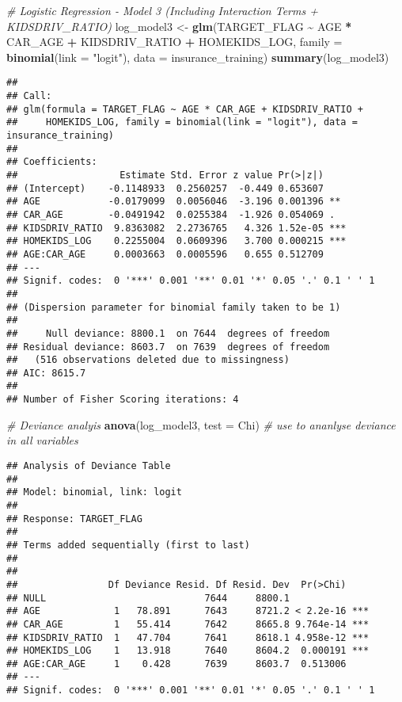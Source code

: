 \documentclass[
]{article}
\newenvironment{Shaded}{\begin{snugshade}}{\end{snugshade}}
\newcommand{\AttributeTok}[1]{\textcolor[rgb]{0.13,0.29,0.53}{#1}}
\newcommand{\CommentTok}[1]{\textcolor[rgb]{0.56,0.35,0.01}{\textit{#1}}}
\newcommand{\FunctionTok}[1]{\textcolor[rgb]{0.13,0.29,0.53}{\textbf{#1}}}
\newcommand{\NormalTok}[1]{#1}
\newcommand{\OtherTok}[1]{\textcolor[rgb]{0.56,0.35,0.01}{#1}}
\newcommand{\SpecialCharTok}[1]{\textcolor[rgb]{0.81,0.36,0.00}{\textbf{#1}}}
\newcommand{\StringTok}[1]{\textcolor[rgb]{0.31,0.60,0.02}{#1}}
\begin{document}
\begin{Shaded}
\begin{Highlighting}[]
\CommentTok{\# Logistic Regression {-} Model 3 (Including Interaction Terms + KIDSDRIV\_RATIO)}
\NormalTok{log\_model3 }\OtherTok{\textless{}{-}} \FunctionTok{glm}\NormalTok{(TARGET\_FLAG }\SpecialCharTok{\textasciitilde{}}\NormalTok{ AGE }\SpecialCharTok{*}\NormalTok{ CAR\_AGE }\SpecialCharTok{+}\NormalTok{ KIDSDRIV\_RATIO }\SpecialCharTok{+}\NormalTok{ HOMEKIDS\_LOG, }
                          \AttributeTok{family =} \FunctionTok{binomial}\NormalTok{(}\AttributeTok{link =} \StringTok{"logit"}\NormalTok{), }\AttributeTok{data =}\NormalTok{ insurance\_training)}
\FunctionTok{summary}\NormalTok{(log\_model3)}
\end{Highlighting}
\end{Shaded}

\begin{verbatim}
## 
## Call:
## glm(formula = TARGET_FLAG ~ AGE * CAR_AGE + KIDSDRIV_RATIO + 
##     HOMEKIDS_LOG, family = binomial(link = "logit"), data = insurance_training)
## 
## Coefficients:
##                  Estimate Std. Error z value Pr(>|z|)    
## (Intercept)    -0.1148933  0.2560257  -0.449 0.653607    
## AGE            -0.0179099  0.0056046  -3.196 0.001396 ** 
## CAR_AGE        -0.0491942  0.0255384  -1.926 0.054069 .  
## KIDSDRIV_RATIO  9.8363082  2.2736765   4.326 1.52e-05 ***
## HOMEKIDS_LOG    0.2255004  0.0609396   3.700 0.000215 ***
## AGE:CAR_AGE     0.0003663  0.0005596   0.655 0.512709    
## ---
## Signif. codes:  0 '***' 0.001 '**' 0.01 '*' 0.05 '.' 0.1 ' ' 1
## 
## (Dispersion parameter for binomial family taken to be 1)
## 
##     Null deviance: 8800.1  on 7644  degrees of freedom
## Residual deviance: 8603.7  on 7639  degrees of freedom
##   (516 observations deleted due to missingness)
## AIC: 8615.7
## 
## Number of Fisher Scoring iterations: 4
\end{verbatim}

\begin{Shaded}
\begin{Highlighting}[]
\CommentTok{\# Deviance analyis }
\FunctionTok{anova}\NormalTok{(log\_model3, }\AttributeTok{test =} \StringTok{\textquotesingle{}Chi\textquotesingle{}}\NormalTok{) }\CommentTok{\# use to ananlyse deviance in all variables }
\end{Highlighting}
\end{Shaded}

\begin{verbatim}
## Analysis of Deviance Table
## 
## Model: binomial, link: logit
## 
## Response: TARGET_FLAG
## 
## Terms added sequentially (first to last)
## 
## 
##                Df Deviance Resid. Df Resid. Dev  Pr(>Chi)    
## NULL                            7644     8800.1              
## AGE             1   78.891      7643     8721.2 < 2.2e-16 ***
## CAR_AGE         1   55.414      7642     8665.8 9.764e-14 ***
## KIDSDRIV_RATIO  1   47.704      7641     8618.1 4.958e-12 ***
## HOMEKIDS_LOG    1   13.918      7640     8604.2  0.000191 ***
## AGE:CAR_AGE     1    0.428      7639     8603.7  0.513006    
## ---
## Signif. codes:  0 '***' 0.001 '**' 0.01 '*' 0.05 '.' 0.1 ' ' 1
\end{verbatim}
\end{document}
